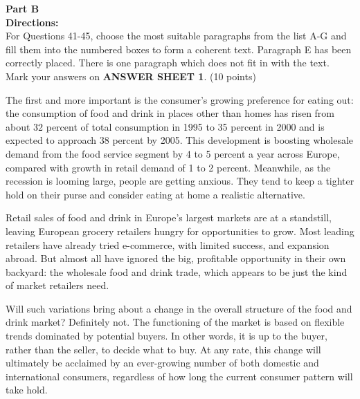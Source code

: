 \newpage

\noindent
\textbf{Part B}\\
\textbf{Directions:}\\
For Questions 41-45, choose the most suitable paragraphs from the list
A-G and fill them into the numbered boxes to form a coherent text.
Paragraph E has been correctly placed. There is one paragraph which does
not fit in with the text. Mark your answers on \textbf{ANSWER SHEET 1}.
(10 points)

\begin{listmatch}
	\item
The first and more important is the consumer's growing
preference for eating out: the consumption of food and drink in places
other than homes has risen from about 32 percent of total consumption in
1995 to 35 percent in 2000 and is expected to approach 38 percent by
2005. This development is boosting wholesale demand from the food
service segment by 4 to 5 percent a year across Europe, compared with
growth in retail demand of 1 to 2 percent. Meanwhile, as the recession
is looming large, people are getting anxious. They tend to keep a
tighter hold on their purse and consider eating at home a realistic
alternative.


\item 
 Retail sales of food and drink in Europe's largest markets are
at a standstill, leaving European grocery retailers hungry for
opportunities to grow. Most leading retailers have already tried
e-commerce, with limited success, and expansion abroad. But almost all
have ignored the big, profitable opportunity in their own backyard: the
wholesale food and drink trade, which appears to be just the kind of
market retailers need.


\item 
 Will such variations bring about a change in the overall
structure of the food and drink market? Definitely not. The functioning
of the market is based on flexible trends dominated by potential buyers.
In other words, it is up to the buyer, rather than the seller, to decide
what to buy. At any rate, this change will ultimately be acclaimed by an
ever-growing number of both domestic and international consumers,
regardless of how long the current consumer pattern will take hold.



\end{listmatch}
